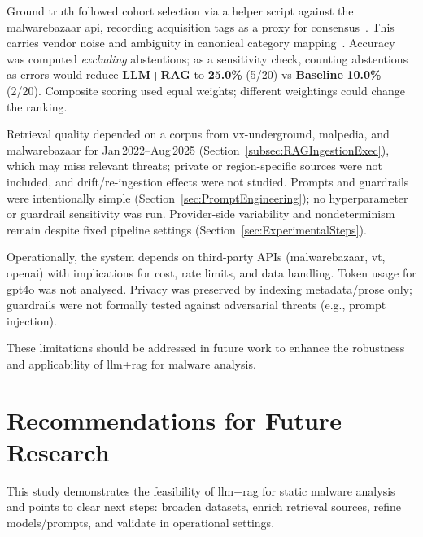 Ground truth followed cohort selection via a helper script against the \gls{malwarebazaar}
\gls{api}, recording acquisition tags as a proxy for consensus~\cite{rexisSamplesExtractorScript}.
This carries vendor noise and ambiguity in canonical category mapping~\cite{gaber2024malware}.
Accuracy was computed \textit{excluding} abstentions; as a sensitivity check, counting abstentions
as errors would reduce \textbf{LLM+RAG} to \textbf{25.0\%} (5/20) vs \textbf{Baseline}
\textbf{10.0\%} (2/20). Composite scoring used equal weights; different weightings could change the
ranking.

Retrieval quality depended on a corpus from \gls{vx-underground}, \gls{malpedia}, and
\gls{malwarebazaar} for Jan\,2022--Aug\,2025 (Section~\ref{subsec:RAGIngestionExec}), which may
miss relevant threats; private or region-specific sources were not included, and drift/re-ingestion
effects were not studied. Prompts and guardrails were intentionally simple
(Section~\ref{sec:PromptEngineering}); no hyperparameter or guardrail sensitivity was run.
Provider-side variability and nondeterminism remain despite fixed pipeline settings
(Section~\ref{sec:ExperimentalSteps}).

Operationally, the system depends on third-party APIs (\gls{malwarebazaar}, \gls{vt}, \gls{openai})
with implications for cost, rate limits, and data handling. Token usage for \gls{gpt4o} was not
analysed. Privacy was preserved by indexing metadata/prose only; guardrails were not formally
tested against adversarial threats (e.g., prompt injection).

These limitations should be addressed in future work to enhance the robustness and applicability of
\gls{llm}+\gls{rag} for malware analysis.

\section{Recommendations for Future Research}\label{sec:RecommendationsFutureWork}
This study demonstrates the feasibility of \gls{llm}+\gls{rag} for static malware analysis and
points to clear next steps: broaden datasets, enrich retrieval sources, refine models/prompts, and
validate in operational settings.

